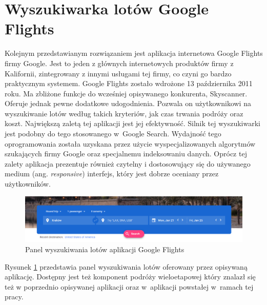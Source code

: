 \documentclass[12pt, twoside]{report}
\begin{document}
\section{Wyszukiwarka lotów Google Flights}
Kolejnym przedstawianym rozwiązaniem jest aplikacja internetowa Google Flights firmy Google. Jest to jeden z głównych internetowych produktów firmy z Kalifornii, zintegrowany z innymi usługami tej firmy, co czyni go bardzo praktycznym systemem. Google Flights zostało wdrożone 13 października 2011 roku. Ma zbliżone funkcje do wcześniej opisywanego konkurenta, Skyscanner. Oferuje jednak pewne dodatkowe udogodnienia. Pozwala on użytkownikowi na wyszukiwanie lotów według takich kryteriów, jak czas trwania podróży oraz koszt. Największą zaletą tej aplikacji jest jej efektywność. Silnik tej wyszukiwarki jest podobny do tego stosowanego w~Google Search. Wydajność tego oprogramowania została uzyskana przez użycie wyspecjalizowanych algorytmów szukających firmy Google oraz specjalnemu indeksowaniu danych. Oprócz tej zalety aplikacja prezentuje również czytelny i dostosowujący się do używanego medium (ang. \emph{responsive}) interfejs, który jest dobrze oceniany przez użytkowników.

\begin{figure}[!ht]
\centering
\includegraphics[scale=0.50, keepaspectratio]{google_flights_search_panel.png}
\caption{Panel wyszukiwania lotów aplikacji Google Flights}
\label{fig:google_flights_search_panel}
\end{figure}
Rysunek \ref{fig:google_flights_search_panel} przedstawia panel wyszukiwania lotów oferowany przez opisywaną aplikację. Dostępny jest też komponent podróży wieloetapowej który znalazł się też w poprzednio opisywanej aplikacji oraz w~aplikacji powstałej w~ramach tej pracy.
\end{document}
